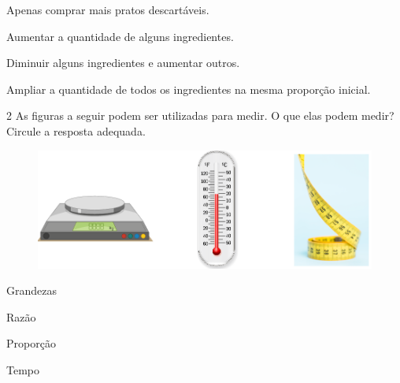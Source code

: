 \begin{escolha}
\item
  Apenas comprar mais pratos descartáveis.
\item
  Aumentar a quantidade de alguns ingredientes.
\item
  Diminuir alguns ingredientes e aumentar outros.
\item
  Ampliar a quantidade de todos os ingredientes na mesma proporção inicial. 
\end{escolha}



\num{2} As figuras a seguir podem ser utilizadas para medir. O que elas podem medir? Circule a resposta adequada.

\begin{figure}[htpb!]
\centering
\includegraphics[width=\textwidth]{../ilustracoes/MAT5/SAEB_5ANO_MAT_figura78.png}
\end{figure}

\begin{escolha}
\item
  Grandezas 
\item
  Razão
\item
  Proporção
\item
  Tempo
\end{escolha}



